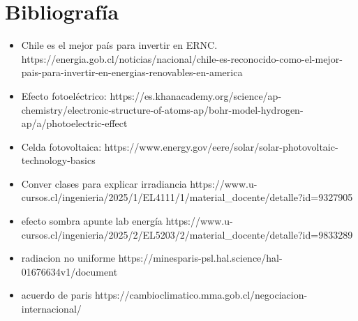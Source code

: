 \section{Bibliografía}

\begin{itemize}

    \item [0] Chile es el mejor país para invertir en ERNC.
    https://energia.gob.cl/noticias/nacional/chile-es-reconocido-como-el-mejor-pais-para-invertir-en-energias-renovables-en-america

    \item [1] Efecto fotoeléctrico:
    https://es.khanacademy.org/science/ap-chemistry/electronic-structure-of-atoms-ap/bohr-model-hydrogen-ap/a/photoelectric-effect
    \item [2] Celda fotovoltaica:
    https://www.energy.gov/eere/solar/solar-photovoltaic-technology-basics
    \item [3] Conver clases para explicar irradiancia https://www.u-cursos.cl/ingenieria/2025/1/EL4111/1/material_docente/detalle?id=9327905
    \item [4] efecto sombra apunte lab energía
    https://www.u-cursos.cl/ingenieria/2025/2/EL5203/2/material_docente/detalle?id=9833289
    \item [5] radiacion no uniforme
    https://minesparis-psl.hal.science/hal-01676634v1/document
    \item [9] acuerdo de paris
    https://cambioclimatico.mma.gob.cl/negociacion-internacional/
\end{itemize}